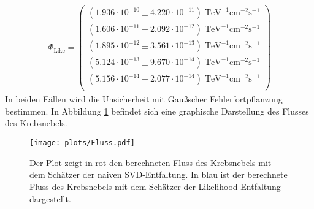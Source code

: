 \begin{align*}
	\Phi_{\text{Like}} = \begin{pmatrix}
			(1.936\cdot10^{-10}\pm 4.220\cdot10^{-11})\;\mathrm{TeV}^{-1}\mathrm{cm}^{-2}\mathrm{s}^{-1}\\
			(1.606\cdot10^{-11}\pm 2.092\cdot10^{-12})\;\mathrm{TeV}^{-1}\mathrm{cm}^{-2}\mathrm{s}^{-1}\\
			(1.895\cdot10^{-12}\pm 3.561\cdot10^{-13})\;\mathrm{TeV}^{-1}\mathrm{cm}^{-2}\mathrm{s}^{-1}\\
			(5.124\cdot10^{-13}\pm 9.670\cdot10^{-14})\;\mathrm{TeV}^{-1}\mathrm{cm}^{-2}\mathrm{s}^{-1}\\
			(5.156\cdot10^{-14}\pm 2.077\cdot10^{-14})\;\mathrm{TeV}^{-1}\mathrm{cm}^{-2}\mathrm{s}^{-1}\\
	 \end{pmatrix}
\end{align*}
In beiden Fällen wird die Unsicherheit mit Gaußscher Fehlerfortpflanzung bestimmen. In Abbildung \ref{fig:Fluss} befindet sich eine graphische Darstellung des Flusses des Krebsnebels.\\
\begin{figure}
  \centering
  \texttt{[image: plots/Fluss.pdf]}
  \caption{Der Plot zeigt in rot den berechneten Fluss des Krebsnebels mit dem Schätzer der naiven SVD-Entfaltung. In blau ist der berechnete Fluss des Krebsnebels mit dem Schätzer der Likelihood-Entfaltung dargestellt.}
  \label{fig:Fluss}
\end{figure}
